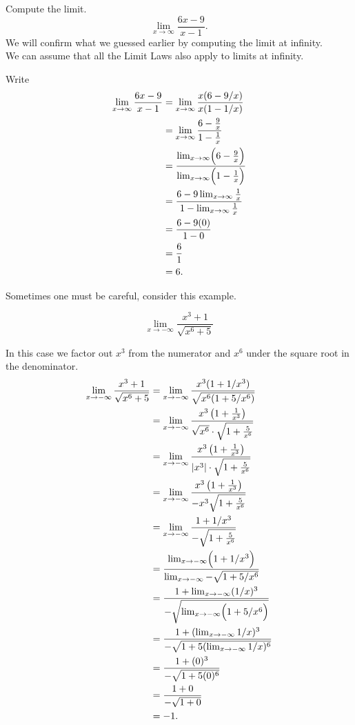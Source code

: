 \documentclass{ximera}
\begin{document}
\begin{example}  Compute the limit.
\[
\lim_{x\to\infty} \frac{6x-9}{x-1}.
\]
We will confirm what we guessed earlier by computing the limit at infinity.\\
 We can assume that all the Limit Laws also apply to limits at infinity.
\begin{explanation}
Write
\begin{align*}
\lim_{x\to\infty}\frac{6x-9}{x-1} &= \lim_{x\to\infty}\frac{x(6-9/x)}{x(1-1/x)}\\
&=\lim_{x\to\infty}\frac{6 - \frac{9}{x}}{1 - \frac{1}{x}}\\
&=\frac{\lim_{x\to\infty}\Bigl(6- \frac{9}{x}\Bigr)}{\lim_{x\to\infty}\Bigl(1- \frac{1}{x}\Bigr)}\\
&=\frac{6-9\lim_{x\to\infty}  \frac{1}{x}}{1-\lim_{x\to\infty} \frac{1}{x}}\\
&=\frac{6-9(0)}{1-0}\\
&=  \frac{6}{1}\\
&= 6.
\end{align*}
\end{explanation}
\end{example}

Sometimes one must be careful, consider this example.

\begin{example}

\[
\lim_{x\to -\infty} \frac{x^3+1}{\sqrt{x^6+5}}
\]
\begin{explanation}
In this case we factor out $ x^3 $ from the numerator and $ x^6 $ under the square root in the denominator.
\begin{align*}
\lim_{x\to -\infty} \frac{x^3+1}{\sqrt{x^6+5}} &= \lim_{x\to -\infty} \frac{x^3(1+1/x^3)}{\sqrt{x^6(1+5/x^6)}}\\
&=\lim_{x\to -\infty}\frac{x^3\left( 1+\frac{1}{x^3}\right) }{\sqrt{x^6}\cdot \sqrt{1+\frac{5}{x^6}}}\\
&=\lim_{x\to -\infty}\frac{x^3\left( 1+\frac{1}{x^3}\right) }{\left|x^3\right| \cdot \sqrt{1+\frac{5}{x^6}}}\\
&=\lim_{x\to -\infty}\frac{x^3\left( 1+\frac{1}{x^3}\right) }{-x^3\sqrt{1+\frac{5}{x^6}}}\\
&= \lim_{x\to -\infty} \frac{1+1/x^3}{-\sqrt{1+\frac{5}{x^6}}}\\
&= \frac{ \lim_{x\to -\infty}\Bigl(1+1/x^3\Bigr)}{\lim_{x\to -\infty}-\sqrt{1+5/x^6}}\\
&= \frac{ 1+\lim_{x\to -\infty}(1/x)^3}{-\sqrt{\lim_{x\to -\infty}\Bigl(1+5/x^6\Bigr)}}\\
&= \frac{ 1+(\lim_{x\to -\infty}1/x)^3}{-\sqrt{1+5(\lim_{x\to -\infty}1/x)^6}}\\
&= \frac{ 1+(0)^3}{-\sqrt{1+5(0)^6}}\\
&= \frac{ 1+0}{-\sqrt{1+0}}\\
&= -1.
\end{align*}
\end{explanation}
\end{example}
\end{document}

